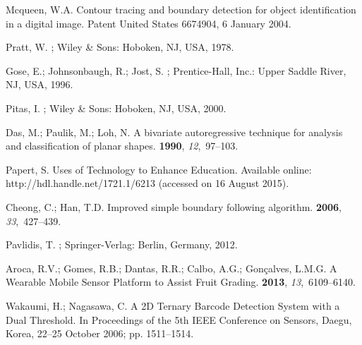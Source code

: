 \documentclass[sensors,article,accept,moreauthors,pdftex,10pt,a4paper]{mdpi}
\begin{document}
\begin{thebibliography}{999} 

Mcqueen, W.A.
\newblock Contour tracing and boundary detection for object identification in a
 digital image.
\newblock Patent United States 6674904, 6 January 2004.

Pratt, W.
; Wiley \& Sons: Hoboken, NJ, USA, 1978.

Gose, E.; Johnsonbaugh, R.; Jost, S.
; Prentice-Hall, Inc.:
 Upper Saddle River, NJ, USA, 1996.

Pitas, I.
; Wiley \& Sons: Hoboken, NJ, USA, 2000.

Das, M.; Paulik, M.; Loh, N.
\newblock A bivariate autoregressive technique for analysis and classification
 of planar shapes.
 {\bf 1990}, {\em 12},~97--103.

Papert, S.
\newblock Uses of Technology to Enhance Education. Available online: http://hdl.handle.net/1721.1/6213 (accessed on 16 August 2015).

Cheong, C.; Han, T.D.
\newblock Improved simple boundary following algorithm.
 {\bf 2006}, {\em 33},~427--439.

Pavlidis, T.
; Springer-Verlag: Berlin, Germany, 2012.

Aroca, R.V.; Gomes, R.B.; Dantas, R.R.; Calbo, A.G.; Gonçalves, L.M.G.
\newblock A Wearable Mobile Sensor Platform to Assist Fruit Grading.
 {\bf 2013}, {\em 13},~6109--6140.

Wakaumi, H.; Nagasawa, C.
\newblock A 2D Ternary Barcode Detection System with a Dual Threshold.
\newblock In Proceedings of the 5th IEEE Conference on Sensors, Daegu, Korea, 22--25 October 2006; pp. 1511--1514.


\end{thebibliography}
\end{document}
